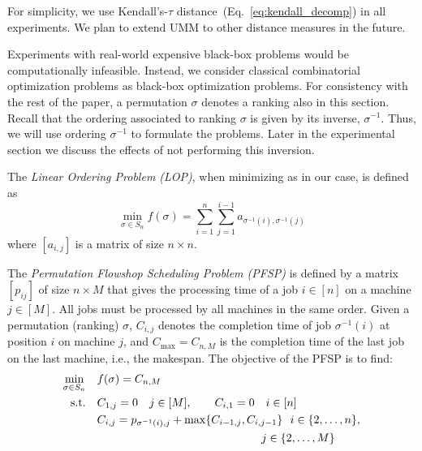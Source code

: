 \documentclass[sigconf,dvipsnames]{acmart}
\begin{document}
%
For simplicity, we use Kendall's-$\tau$
distance~(Eq.~\ref{eq:kendall_decomp}) in all experiments.
We plan to extend UMM to other distance measures in the future.  


%
Experiments with real-world expensive black-box problems would be computationally infeasible. Instead, we consider classical combinatorial optimization problems as black-box optimization problems. For consistency with the rest of the paper, a permutation $\sigma$ denotes a ranking also in this section. Recall that the ordering associated to ranking $\sigma$ is given by its inverse, $\sigma^{-1}$. Thus, we will use ordering $\sigma^{-1}$ to formulate the problems. Later in the experimental section we discuss the effects of not performing this inversion.

The \emph{Linear Ordering Problem (LOP)}, when minimizing as in our case, is defined as
\begin{equation}\label{eq:lop}
  \min_{\sigma \in S_n} f(\sigma) = \sum_{i=1}^{n} \sum_{j=1}^{i-1}  a_{\sigma^{-1}(i), \sigma^{-1}(j)}
\end{equation}
%
where $[a_{i,j}]$ is a matrix of size $n \times n$.


The \emph{Permutation Flowshop Scheduling Problem (PFSP)} is defined by a matrix $[p_{ij}]$ of size $n \times M$ that gives the processing time of a job $i \in [n]$ on a machine $j \in [M]$. All jobs must be processed by all machines in the same order. Given a permutation (ranking) $\sigma$, $C_{i,j}$ denotes the completion time of job $\sigma^{-1}(i)$ at position $i$ on machine $j$, and $C_{\max} = C_{n,M}$  is the completion time of the last job on the last machine, i.e., the makespan. The objective of the PFSP is to find:
\begin{equation}\label{eq:pfsp}
  \begin{split}
    \min_{\sigma \in S_n}\quad& f(\sigma) = C_{n,M}\\
    \text{s.t.}\quad & C_{1,j} = 0 \quad j\in [M], \qquad C_{i,1} = 0\quad i \in [n]\\
    &C_{i,j} = p_{\sigma^{-1}(i),j} + \max\{C_{i-1, j}, C_{i, j-1}\}  \ \  i \in \{2,\dotsc,n\},\\
    &\hspace{14.5em} j \in\{2,\dotsc, M\}
  \end{split}
\end{equation}
\end{document}
